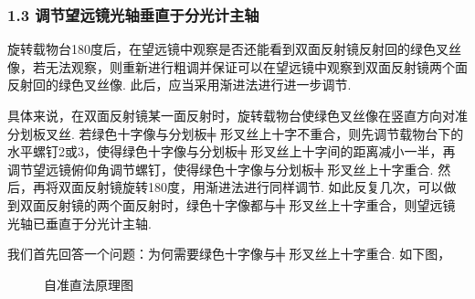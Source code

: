 \documentclass[UTF8]{ctexart}
\begin{document}
\subsubsection*{1.3 调节望远镜光轴垂直于分光计主轴}

旋转载物台180度后，在望远镜中观察是否还能看到双面反射镜反射回的绿色叉丝像，若无法观察，则重新进行粗调并保证可以在望远镜中观察到双面反射镜两个面反射回的绿色叉丝像. 此后，应当采用渐进法进行进一步调节.\par
具体来说，在双面反射镜某一面反射时，旋转载物台使绿色叉丝像在竖直方向对准分划板叉丝. 若绿色十字像与分划板╪ 形叉丝上十字不重合，则先调节载物台下的水平螺钉2或3，使得绿色十字像与分划板╪ 形叉丝上十字间的距离减小一半，再调节望远镜俯仰角调节螺钉，使得绿色十字像与分划板╪ 形叉丝上十字重合. 然后，再将双面反射镜旋转180度，用渐进法进行同样调节. 如此反复几次，可以做到双面反射镜的两个面反射时，绿色十字像都与╪ 形叉丝上十字重合，则望远镜光轴已垂直于分光计主轴.\par
我们首先回答一个问题：为何需要绿色十字像与╪ 形叉丝上十字重合. 如下图，
\begin{figure}[H]\centering
    {
    \hspace{20mm}
    \caption{自准直法原理图}
    }
    \end{figure}
\end{document}
